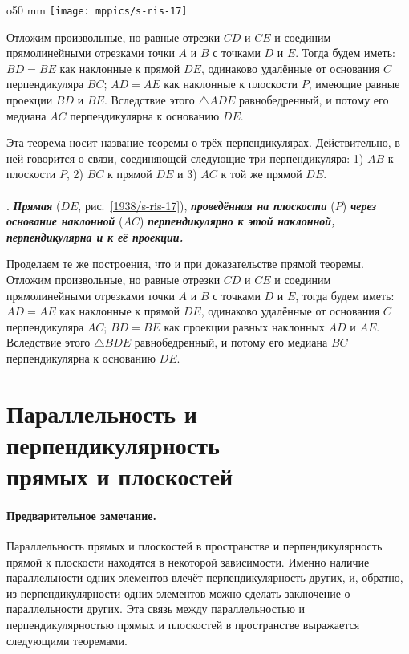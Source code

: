 \begin{wrapfigure}{o}{50 mm}
\centering
\texttt{[image: mppics/s-ris-17]}
\caption{}\label{1938/s-ris-17}
\end{wrapfigure}

Отложим произвольные, но равные отрезки $CD$ и $CE$ и соединим прямолинейными отрезками точки $A$ и $B$ с точками $D$ и $E$.
Тогда будем иметь: $BD=BE$ как наклонные к прямой $DE$, одинаково удалённые от основания $C$ перпендикуляра $BC$;
$AD=AE$ как наклонные к плоскости $P$, имеющие равные проекции $BD$ и $BE$.
Вследствие этого $\triangle ADE$ равнобедренный, и потому его медиана $AC$ перпендикулярна к основанию $DE$.

Эта теорема носит название теоремы о трёх перпендикулярах.
Действительно, в ней говорится о связи, соединяющей следующие три перпендикуляра: 1) $AB$ к плоскости $P$, 2) $BC$ к прямой $DE$ и 3) $AC$ к той же прямой $DE$.


\paragraph{}\label{1938/s29}
.
\textbf{\emph{Прямая}} ($DE$, рис.~\ref{1938/s-ris-17}), \textbf{\emph{проведённая на плоскости}} ($P$) \textbf{\emph{через основание наклонной}} ($AC$) \textbf{\emph{перпендикулярно к этой наклонной, перпендикулярна и к её проекции.}}

Проделаем те же построения, что и при доказательстве прямой теоремы.
Отложим произвольные, но равные отрезки $CD$ и $CE$ и соединим прямолинейными отрезками точки $A$ и $B$ с точками $D$ и $E$, тогда будем иметь: $AD=AE$ как наклонные к прямой $DE$, одинаково удалённые от основания $C$ перпендикуляра $AC$;
$BD=BE$ как проекции равных наклонных $AD$ и $AE$.
Вследствие этого $\triangle BDE$ равнобедренный, и потому его медиана $BC$ перпендикулярна к основанию $DE$.



\section[Параллельность и перпендикулярность]{Параллельность и перпендикулярность\\ прямых и плоскостей}


\paragraph{Предварительное замечание.}\label{1938/s30}
Параллельность прямых и плоскостей в пространстве и перпендикулярность прямой к плоскости находятся в некоторой зависимости.
Именно наличие параллельности одних элементов влечёт перпендикулярность других, и, обратно, из перпендикулярности одних элементов можно сделать заключение о параллельности других.
Эта связь между параллельностью и перпендикулярностью прямых и плоскостей в пространстве выражается следующими теоремами.

